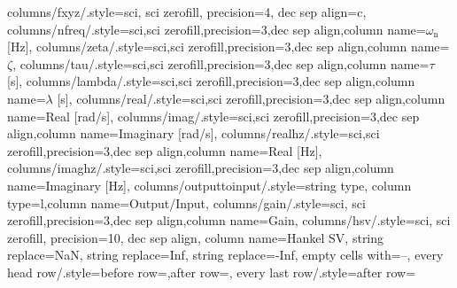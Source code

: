 {columns/fxyz/.style={sci, sci zerofill, precision=4, dec sep align={c}},
columns/nfreq/.style={sci,sci zerofill,precision=3,dec sep align,column name={$\omega_\text{n}$ [\si{\hertz}]}},
columns/zeta/.style={sci,sci zerofill,precision=3,dec sep align,column name={$\zeta$}},
columns/tau/.style={sci,sci zerofill,precision=3,dec sep align,column name={$\tau$ [\si{\s}]}},
columns/lambda/.style={sci,sci zerofill,precision=3,dec sep align,column name={$\lambda$ [\si{\s}]}},
columns/real/.style={sci,sci zerofill,precision=3,dec sep align,column name={Real [\si{\radian/\s}]}},
columns/imag/.style={sci,sci zerofill,precision=3,dec sep align,column name={Imaginary [\si{\radian/\s}]}},
columns/realhz/.style={sci,sci zerofill,precision=3,dec sep align,column name={Real [\si{\hertz}]}},
columns/imaghz/.style={sci,sci zerofill,precision=3,dec sep align,column name={Imaginary [\si{\hertz}]}},
columns/outputtoinput/.style={string type, column type=l,column name={Output/Input}},
columns/gain/.style={sci, sci zerofill,precision=3,dec sep align,column name={Gain}},
columns/hsv/.style={sci, sci zerofill, precision=10, dec sep align, column name={Hankel SV}},
string replace={NaN}{},
string replace={Inf}{},
string replace={-Inf}{},
empty cells with={--},
every head row/.style={before row={\toprule},after row={\midrule}},
every last row/.style={after row={\bottomrule}}}